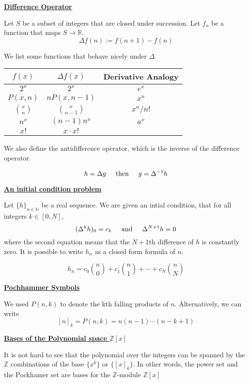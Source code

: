\documentclass{article}
\newcommand{\new}[1]{
    \vspace{2mm}
    \noindent
    \textbf{
    \underline{#1}}
}
\newcommand{\textAnd}{
    {
        \hspace{5mm}
        \textrm{and}
        \hspace{5mm}
    }
}
\newcommand{\textThen}{
    {
        \hspace{5mm}
        \textrm{then}
        \hspace{5mm}
    }
}
\newcommand{\m}{
    \cdot
}
\begin{document}
\new{Difference Operator }

Let $S$ be a subset of integers that are 
closed under succession. Let $f_n$ be a 
function that maps $S\rightarrow \mathbb{R}$. 
\[
    \Delta f(n) := f(n + 1)- f(n)
\]

We list some functions that behave nicely 
under $\Delta$

\begin{center}
    \begin{tabular} {|c|c|c|}
        \hline
        $f(x)$ & $\Delta f(x)$ & Derivative Analogy\\
        \hline 
        $2^x$ & $2^x$ & $e^x$\\
        \hline
        $P(x, n)$ & $nP(x, n-1)$ & $x^n$\\
        \hline 
        $\binom{x} n$ & $\binom x {n - 1}$ & $x^n / n!$\\
        \hline 
        $n^x$ & $(n - 1) n^x$ & $a^x$ \\
        \hline
        $x!$ & $x \m x!$ & \\ 
        \hline
    \end{tabular}
\end{center}

We also define the antidifference operator, 
which is the inverse of the difference operator. 

\[
    h = \Delta g
    \textThen
    g = \Delta^{-1} h
\]

\new{An initial condition problem}

Let $\{h\}_{n \in \mathbb{N}}$ be a real sequence. 
We are given an intial condition, that for all 
integers $k \in [0, N]$, 
\[
    (\Delta^k h)_0 = c_k
    \textAnd 
    \Delta^{N + 1}h = 0
\]
where the second equation means that the $N+1$th 
difference of $h$ is constantly zero. It is possible to 
write $h_n$ as a closed form formula of $n$. 

\[
    h_n = 
    c_0 \binom n 0 + c_1 \binom n 1 + \cdots 
    + c_N \binom n N
\]

\new{Pochhammer Symbols}
We used $P(n, k)$ to denote the kth falling products 
of $n$. Alternatively, we can write 
\[
    [n]_k = P(n, k) = n(n - 1) \cdots (n - k + 1)
\]

\new{Bases of the Polynomial space $\mathbb{Z}[x]$}
It is not hard to see that the polynomial over 
the integers can be spanned by the $\mathbb{Z}$ 
combinations of the base $\{x^k\}$ or $\{[x]_k\}$. 
In other words, the power set and the Pockhamer set 
are bases for the $\mathbb{Z}$-module $\mathbb{Z}[x]$
\end{document}
